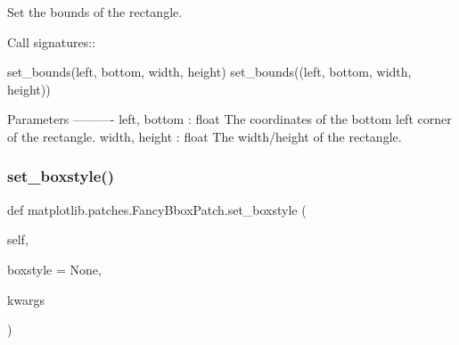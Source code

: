 \begin{DoxyVerb}Set the bounds of the rectangle.

Call signatures::

    set_bounds(left, bottom, width, height)
    set_bounds((left, bottom, width, height))

Parameters
----------
left, bottom : float
    The coordinates of the bottom left corner of the rectangle.
width, height : float
    The width/height of the rectangle.
\end{DoxyVerb}
 \mbox{\label{classmatplotlib_1_1patches_1_1FancyBboxPatch_aa523ab2aca55a71615448918e5b94218}} 
\subsubsection{\texorpdfstring{set\+\_\+boxstyle()}{set\_boxstyle()}}
{\footnotesize\ttfamily def matplotlib.\+patches.\+Fancy\+Bbox\+Patch.\+set\+\_\+boxstyle (\begin{DoxyParamCaption}\item[{}]{self,  }\item[{}]{boxstyle = {\ttfamily None},  }\item[{}]{kwargs }\end{DoxyParamCaption})}

